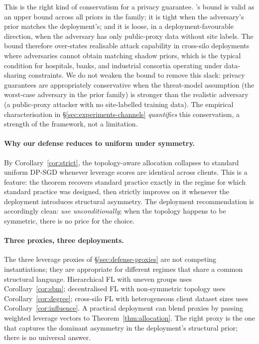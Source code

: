 This is the right kind of conservatism for a privacy guarantee.
\Fulcrum's bound is valid as an upper bound across all priors in the
family; it is tight when the adversary's prior matches the deployment's;
and it is loose, in a deployment-favourable direction, when
the adversary has only public-proxy data without site labels. The bound
therefore over-states realisable attack capability in cross-silo
deployments where adversaries cannot obtain matching shadow priors,
which is the typical condition for hospitals, banks, and industrial
consortia operating under data-sharing constraints. We do not weaken
the bound to remove this slack: privacy guarantees are appropriately
conservative when the threat-model assumption (the worst-case adversary
in the prior family) is stronger than the realistic adversary (a
public-proxy attacker with no site-labelled training data). The
empirical characterisation in \S\ref{sec:experiments-channels}
\emph{quantifies} this conservatism, a strength of the framework, not a limitation.

\paragraph{Why our defense reduces to uniform under symmetry.}
By Corollary~\ref{cor:strict}, the topology-aware allocation collapses
to standard uniform DP-SGD whenever leverage scores are identical
across clients. This is a feature: the theorem recovers standard
practice exactly in the regime for which standard practice was designed,
then strictly improves on it whenever the deployment introduces
structural asymmetry. The deployment recommendation is accordingly
clean: \emph{use \Fulcrum unconditionally}; when the topology happens
to be symmetric, there is no price for the choice.

\paragraph{Three proxies, three deployments.}
The three leverage proxies of \S\ref{sec:defense-proxies} are not
competing instantiations; they are appropriate for different regimes
that share a common structural language. Hierarchical FL with uneven
groups uses Corollary~\ref{cor:sbm}; decentralised FL with non-symmetric
topology uses Corollary~\ref{cor:degree}; cross-silo FL with
heterogeneous client dataset sizes uses
Corollary~\ref{cor:influence}. A practical deployment can blend
proxies by passing weighted leverage vectors to
Theorem~\ref{thm:allocation}. The right proxy is the one that captures
the dominant asymmetry in the deployment's structural prior; there is
no universal answer.

